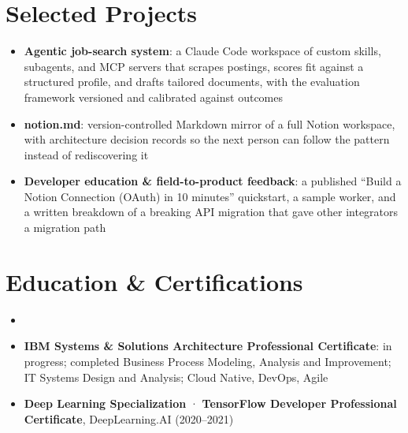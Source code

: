 \documentclass[11pt,a4paper,sans]{moderncv}
\begin{document}
\section{Selected Projects}
\vspace{1pt}
\begin{itemize}
\item \textbf{Agentic job-search system}: a Claude Code workspace of custom skills, subagents, and MCP servers that scrapes postings, scores fit against a structured profile, and drafts tailored documents, with the evaluation framework versioned and calibrated against outcomes
\item \textbf{notion.md}: version-controlled Markdown mirror of a full Notion workspace, with architecture decision records so the next person can follow the pattern instead of rediscovering it
\item \textbf{Developer education \& field-to-product feedback}: a published ``Build a Notion Connection (OAuth) in 10 minutes'' quickstart, a sample worker, and a written breakdown of a breaking API migration that gave other integrators a migration path
\end{itemize}


\section{Education \& Certifications}
\vspace{1pt}
\begin{itemize}

\item{}

\vspace{3pt}

\item \textbf{IBM Systems \& Solutions Architecture Professional Certificate}: in progress; completed Business Process Modeling, Analysis and Improvement; IT Systems Design and Analysis; Cloud Native, DevOps, Agile

\item \textbf{Deep Learning Specialization} · \textbf{TensorFlow Developer Professional Certificate}, DeepLearning.AI (2020--2021)

\end{itemize}
\end{document}
